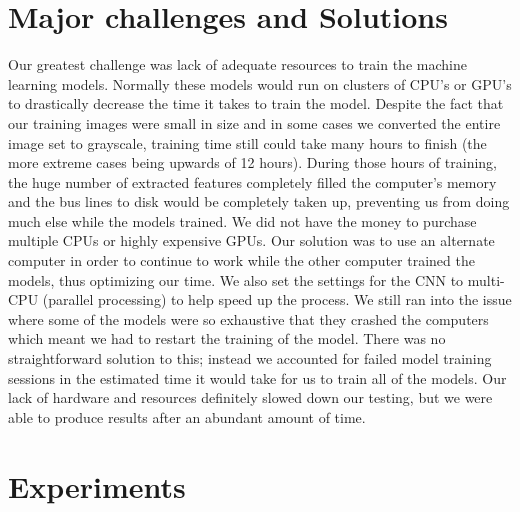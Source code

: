 \documentclass[conference]{IEEEtran}
\begin{document}
\section{Major challenges and Solutions}
Our greatest challenge was lack of adequate resources to train the machine learning models. Normally these models would run on clusters of CPU’s or GPU’s to drastically decrease the time it takes to train the model. Despite the fact that our training images were small in size and in some cases we converted the entire image set to grayscale, training time still could take many hours to finish (the more extreme cases being upwards of 12 hours). During those hours of training, the huge number of extracted features completely filled the computer's memory and the bus lines to disk would be completely taken up, preventing us from doing much else while the models trained. We did not have the money to purchase multiple CPUs or highly expensive GPUs. Our solution was to use an alternate computer in order to continue to work while the other computer trained the models, thus optimizing our time. We also set the settings for the CNN to multi-CPU (parallel processing) to help speed up the process. We still ran into the issue where some of the models were so exhaustive that they crashed the computers which meant we had to restart the training of the model. There was no straightforward solution to this; instead we accounted for failed model training sessions in the estimated time it would take for us to train all of the models. Our lack of hardware and resources definitely slowed down our testing, but we were able to produce results after an abundant amount of time. 
\section{Experiments}
\end{document}
